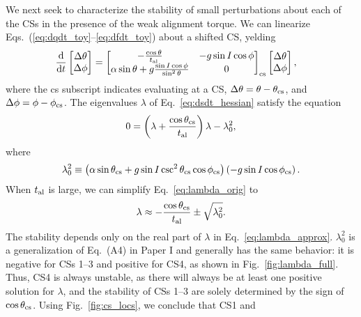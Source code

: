 \documentclass[
        fleqn,
        usenatbib,
        referee,
    ]{mnras}
\newcommand*{\rd}[2]{\frac{\mathrm{d}#1}{\mathrm{d}#2}}
\newcommand*{\p}[1]{\left(#1\right)}
\begin{document}
We next seek to characterize the stability of small perturbations about each of
the CSs in the presence of the weak alignment torque. We can linearize
Eqs.~(\ref{eq:dqdt_toy}--\ref{eq:dfdt_toy}) about a shifted CS, yelding
\begin{align}
    \rd{}{t}\begin{bmatrix}
        \Delta \theta\\ \Delta \phi
    \end{bmatrix} &= \begin{bmatrix}
        -\frac{\cos \theta}{t_{\rm al}} &
        -g\sin I \cos \phi \\
        \alpha \sin \theta + g\frac{\sin I \cos \phi}{\sin^2\theta} &
        0
    \end{bmatrix}_{\rm cs}\begin{bmatrix}
        \Delta \theta \\ \Delta \phi
    \end{bmatrix},\label{eq:dsdt_hessian}
\end{align}
where the cs subscript indicates evaluating at a CS, $\Delta \theta = \theta -
\theta_{\rm cs}$, and $\Delta \phi = \phi - \phi_{\rm cs}$. The eigenvalues
$\lambda$ of Eq.~\eqref{eq:dsdt_hessian} satisfy the equation
\begin{equation}
    0 = \p{\lambda + \frac{\cos \theta_{\rm cs}}{t_{\rm al}}}\lambda
        - \lambda_0^2,\label{eq:lambda_orig}
\end{equation}
where
\begin{equation}
    \lambda_0^2 \equiv \p{\alpha
        \sin \theta_{\rm cs} + g\sin I \csc^2\theta_{\rm cs}\cos \phi_{\rm cs}}
            \p{- g \sin I \cos \phi_{\rm cs}}\label{eq:def_l0_sq}.
\end{equation}
When $t_{\rm al}$ is large, we can simplify Eq.~\eqref{eq:lambda_orig} to
\begin{equation}
    \lambda \approx -\frac{\cos \theta_{\rm cs}}{t_{\rm al}}
        \pm \sqrt{\lambda_0^2}. \label{eq:lambda_approx}
\end{equation}
The stability depends only on the real part of $\lambda$ in
Eq.~\eqref{eq:lambda_approx}. $\lambda_0^2$ is a generalization of Eq.~(A4)
in Paper I and generally has the same behavior: it is negative for CSs
1--3 and positive for CS4, as shown in Fig.~\ref{fig:lambda_full}. Thus, CS4 is
always unstable, as there will always be at least one positive solution for
$\lambda$, and the stability of CSs 1--3 are solely determined by the sign of
$\cos \theta_{\rm cs}$. Using Fig.~\ref{fig:cs_locs}, we conclude that CS1 and
\end{document}
